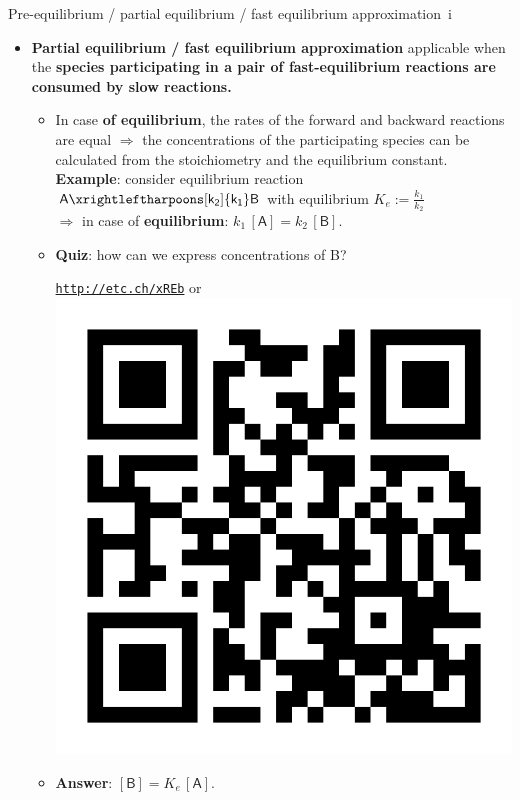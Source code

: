 \begin{frame}{Pre-equilibrium / partial equilibrium / fast equilibrium approximation \,i}
	\small
	\begin{itemize}
		\item \alert{\bf Partial equilibrium / fast equilibrium approximation} applicable when the {\bf species participating 
		in a pair of fast-equilibrium reactions are consumed by slow reactions.}
			\begin{itemize}
			\item[(i)] In case {\bf of equilibrium}, the rates of the forward and backward reactions are equal $\Rightarrow$ 
			the concentrations of the participating species can be calculated from the stoichiometry and the equilibrium constant.\\
			{\bf Example}: consider equilibrium reaction $\mathsf{A \xrightleftharpoons[k_2]{k_1} B}$ with equilibrium $K_e := \tfrac{k_1}{k_2}$ \\
			$\Rightarrow$ in case of {\bf equilibrium}: $k_1 \, \mathsf{[A]} = k_2 \, \mathsf{[B]}$.
			\item \alert{\bf Quiz}: how can we express concentrations of B?
			\begin{center}
				\href{http://etc.ch/xREb}{\textcolor{indigo(dye)}{\tt http://etc.ch/xREb}} \quad or \quad 
				\includegraphics[height=0.18\columnwidth]{figures/chemical-kinetics/polls.png}
			\end{center}
			\vskip 10pt
			\hiddenpause
			\item  {\bf Answer}: $\mathsf{[B]} = K_e \, \mathsf{[A]}$.
			\end{itemize}	
	\end{itemize}
\end{frame}

